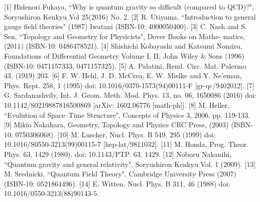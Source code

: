 \documentclass{article}
\begin{document}
[1] Hidenori Fukaya, ``Why is quantum gravity so difficult (compared to QCD)?", Soryushiron Kenkyu Vol 25(2016) No. 2.
[2] R. Utiyama, ``Introduction to general gauge field theories" (1987) Iwatani (ISBN-10:
4000050400).
[3] C. Nash and S. Sen, ``Topology and Geometry for Physicists", Dover Books on Mathe-
matics, (2011) (ISBN-10: 0486478521).
[4] Shishichi Kobayashi and Katsumi Nomizu, Foundations of Differential Geometry Volume I, II, John Wiley & Sons (1996) (ISBN-10: 0471157333, 0471157325).
[5] A. Palatini, Rend. Circ. Mat. Palermo 43, (1919) 203.
[6] F. W. Hehl, J. D. McCrea, E. W. Mielke and Y. Ne'eman, Phys. Rept. 258, 1 (1995) doi: 10.1016/0370-1573(94)00111-F [gr-qc/9402012].
[7] G. Sardanashvily, Int. J. Geom. Meth. Mod. Phys. 13, no. 06, 1650086 (2016) doi: 10.1142/S0219887816500869 [arXiv: 1602.06776 [math-ph]].
[8] M. Heller, ``Evolution of Space--Time Structure", Concepts of Physics 3, 2006, pp. 119-133.
[9] Mikio Nakahara, Geometry, Topology and Physics CRC Press, (2003) (ISBN-10: 0750306068).
[10] M. Luscher, Nucl. Phys. B 549, 295 (1999) doi: 10.1016/S0550-3213(99)00115-7 [hep-lat/9811032].
[11] M. Honda, Prog. Theor. Phys. 63, 1429 (1980). doi: 10.1143/PTP. 63. 1429.
[12] Noboru Nakanihi, ``Quantum gravity and general relativity", Soryushiron Kenkyu Vol. 1 (2009).
[13] M. Srednicki, ``Quantum Field Theory", Cambridge University Press (2007) (ISBN-10: 0521864496).
[14] E. Witten, Nucl. Phys. B 311, 46 (1988) doi: 10.1016/0550-3213(88)90143-5.
\end{document}
